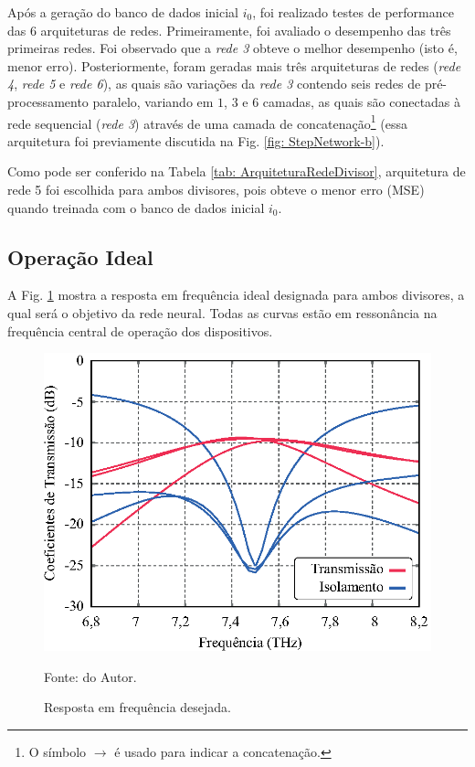 Após a geração do banco de dados inicial $i_{0}$, foi realizado testes de performance das 6 arquiteturas de redes. Primeiramente, foi avaliado o desempenho das três primeiras redes. Foi observado que a \textit{rede 3} obteve o melhor desempenho (isto é, menor erro). Posteriormente, foram geradas mais três arquiteturas de redes (\textit{rede 4}, \textit{rede 5} e \textit{rede 6}), as quais são variações da \textit{rede 3} contendo seis redes de pré-processamento paralelo, variando em $1$, $3$ e $6$ camadas, as quais são conectadas à rede sequencial (\textit{rede 3}) através de uma camada de concatenação\footnote{O símbolo $\rightarrow$ é usado para indicar a concatenação.} (essa arquitetura foi previamente discutida na Fig. \ref{fig: StepNetwork-b}).



Como pode ser conferido na Tabela \ref{tab: ArquiteturaRedeDivisor}, arquitetura de rede 5 foi escolhida para ambos divisores, pois obteve o menor erro (MSE) quando treinada com o banco de dados inicial $i_{0}$.


\subsection{Operação Ideal}

A Fig. \ref{fig: DividerTargetFrequencyResponse} mostra a resposta em frequência ideal designada para ambos divisores, a qual será o objetivo da rede neural. Todas as curvas estão em ressonância na frequência central de operação dos dispositivos. 

\begin{figure}[H]
	\centering\includegraphics{04-Figuras/DividerTargetFrequencyResponse.eps}
	\caption{Resposta em frequência desejada.}
    Fonte: do Autor.
	\label{fig: DividerTargetFrequencyResponse}
\end{figure}




